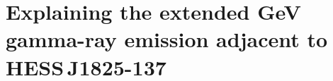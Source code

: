 \chapter{Explaining the extended GeV gamma-ray emission adjacent to HESS\,J1825-137} \label{sec:08}


